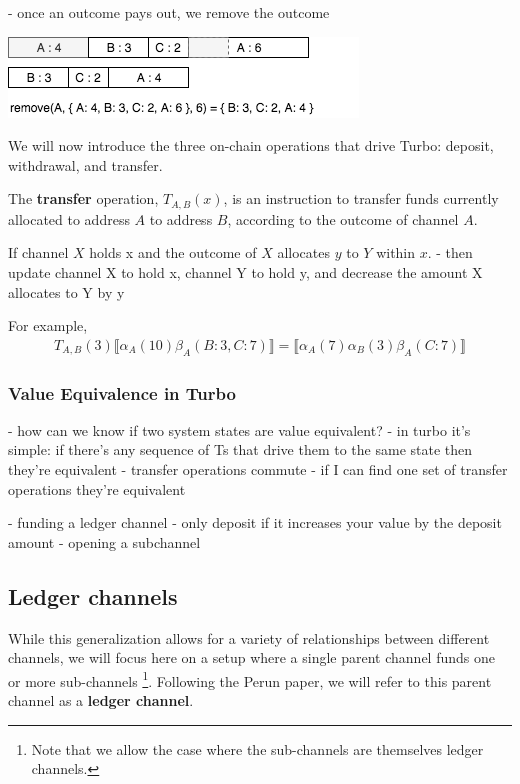 \documentclass{article}
\theoremstyle{definition}
\newcommand{\adj}[1]{\llbracket #1 \rrbracket}
\begin{document}
- once an outcome pays out, we remove the outcome

\begin{center}
  \includegraphics[scale=0.7]{remove} %
\end{center}



We will now introduce the three on-chain operations that drive Turbo: deposit, withdrawal,
and transfer.


The \textbf{transfer} operation, $T_{A,B}(x)$, is an instruction to transfer funds currently allocated
to address $A$ to address $B$, according to the outcome of channel $A$.



If channel $X$ holds x and the outcome of $X$ allocates $y$ to $Y$ within $x$.
- then update channel X to hold x, channel Y to hold y, and decrease the amount X allocates to Y by y

For example, 
\begin{align*}
T_{A,B}(3) \adj{\alpha_A(10)\beta_A(B: 3, C: 7)} = \adj{\alpha_A(7)\alpha_B(3)\beta_A(C: 7)}
\end{align*}

\subsubsection{Value Equivalence in Turbo}

- how can we know if two system states are value equivalent?
- in turbo it's simple: if there's any sequence of Ts that drive them to the same state
  then they're equivalent
- transfer operations commute
- if I can find one set of transfer operations they're equivalent

- funding a ledger channel - only deposit if it increases your value by the deposit amount
- opening a subchannel

\subsection{Ledger channels}

While this generalization allows for a variety of relationships between different channels,
we will focus here on a setup where a single parent channel funds one or more sub-channels
\footnote{Note that we allow the case where the sub-channels are themselves ledger channels.}.
Following the Perun paper, we will refer to this parent channel as a \textbf{ledger channel}.
\end{document}
